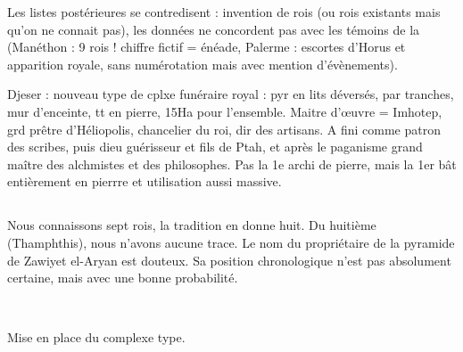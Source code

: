 Les listes postérieures se contredisent : invention de rois (ou rois 
existants mais qu'on ne connait pas), les données ne concordent pas 
avec les témoins de la  (Manéthon : 9 rois ! chiffre fictif 
= énéade, Palerme : escortes d'Horus et apparition royale, sans 
numérotation mais avec mention d'évènements).

Djeser : nouveau type de cplxe funéraire royal : pyr en lits déversés, 
par tranches, mur d'enceinte, tt en pierre, 15Ha pour l'ensemble.
Maitre d'\oe uvre = Imhotep, grd prêtre d'Héliopolis, chancelier du 
roi, dir des artisans. A fini comme patron des scribes, puis dieu 
guérisseur et fils de Ptah, et après le paganisme grand maître des 
alchmistes et des philosophes. Pas la 1e archi de pierre, mais la 1er 
bât entièrement en pierrre et utilisation aussi massive.

\subsection{\texorpdfstring{}{IVe dynastie}}

Nous connaissons sept rois, la tradition en donne huit. Du huitième 
(Thamphthis), nous n'avons aucune trace. Le nom du propriétaire de la 
pyramide de Zawiyet el-Aryan est douteux. Sa position chronologique 
n'est pas absolument certaine, mais avec une bonne probabilité. 

\noi{} \\

Mise en place du complexe type.
                  
